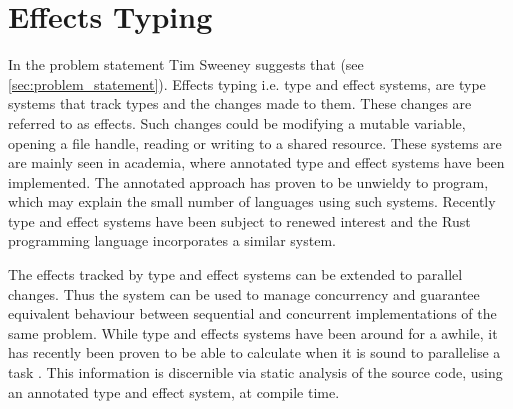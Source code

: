 \section{Effects Typing}
In the problem statement Tim Sweeney suggests that  (see \ref{sec:problem_statement}). Effects typing i.e. type and effect systems, are type systems that track types and the changes made to them\cite{nielson1999type}. These changes are referred to as effects. Such changes could be modifying a mutable variable, opening a file handle, reading or writing to a shared resource. These systems are are mainly seen in academia, where annotated type and effect systems have been implemented. The annotated approach has proven to be unwieldy to program\needcite, which may explain the small number of languages using such systems. Recently type and effect systems have been subject to renewed interest and the Rust programming language incorporates a similar system\cite{rust:lang}.

The effects tracked by type and effect systems can be extended to parallel changes. Thus the system can be used to manage concurrency and guarantee equivalent behaviour between sequential and concurrent implementations of the same problem\cite{krogh2017relational}. While type and effects systems have been around for a awhile, it has recently been proven to be able to calculate when it is sound to parallelise a task \cite{birkedal2012concurrent}. This information is discernible via static analysis of the source code, using an annotated type and effect system, at compile time.

